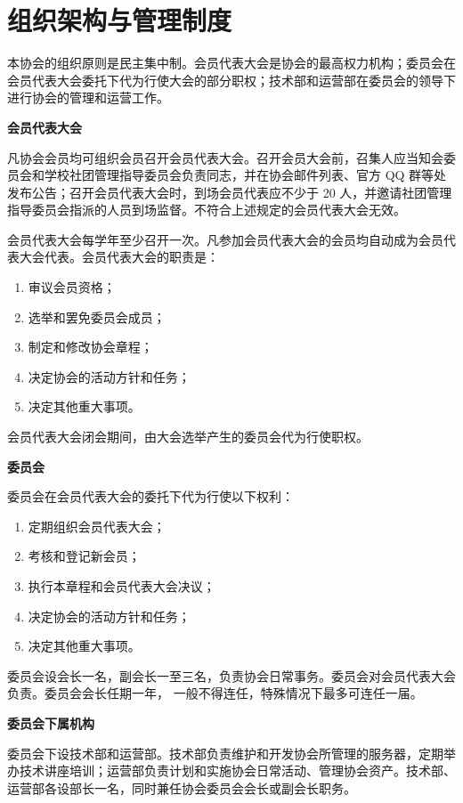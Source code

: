 	\section{组织架构与管理制度}
	
	\term 本协会的组织原则是民主集中制。会员代表大会是协会的最高权力机构；委员会在会员代表大会委托下代为行使大会的部分职权；技术部和运营部在委员会的领导下进行协会的管理和运营工作。
	
	\term \textbf{会员代表大会}
	
	凡协会会员均可组织会员召开会员代表大会。召开会员大会前，召集人应当知会委员会和学校社团管理指导委员会负责同志，并在协会邮件列表、官方 QQ 群等处发布公告；召开会员代表大会时，到场会员代表应不少于 20 人，并邀请社团管理指导委员会指派的人员到场监督。不符合上述规定的会员代表大会无效。
	
	会员代表大会每学年至少召开一次。凡参加会员代表大会的会员均自动成为会员代表大会代表。会员代表大会的职责是：
	
	\begin{enumerate}
		\item 审议会员资格；
		\item 选举和罢免委员会成员；
		\item 制定和修改协会章程；
		\item 决定协会的活动方针和任务；
		\item 决定其他重大事项。
	\end{enumerate}
	
	会员代表大会闭会期间，由大会选举产生的委员会代为行使职权。
	
	\term \textbf{委员会}
	
	委员会在会员代表大会的委托下代为行使以下权利：
	
	\begin{enumerate}
		\item 定期组织会员代表大会；
		\item 考核和登记新会员；
		\item 执行本章程和会员代表大会决议；
		\item 决定协会的活动方针和任务；
		\item 决定其他重大事项。
	\end{enumerate}
	
	委员会设会长一名，副会长一至三名，负责协会日常事务。委员会对会员代表大会负责。委员会会长任期一年， 一般不得连任，特殊情况下最多可连任一届。
	
	\term \textbf{委员会下属机构}
	
	委员会下设技术部和运营部。技术部负责维护和开发协会所管理的服务器，定期举办技术讲座培训；运营部负责计划和实施协会日常活动、管理协会资产。技术部、运营部各设部长一名，同时兼任协会委员会会长或副会长职务。
	
